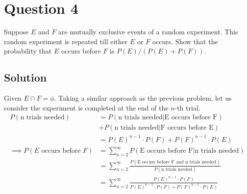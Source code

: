 \section*{Question 4}

Suppose \(E\) and \(F\) are mutually exclusive events of a random experiment.
This random experiment is repeated till either \(E\) or \(F\) occurs.
Show that the probability that \(E\) occurs before \(F\) is \( P(E) / (P(E) + P(F)) \).

\subsection*{Solution}

Given \( E \cap F = \phi \).
Taking a similar approach as the previous problem, let us consider the experiment is completed at the end of the \( n \)-th trial.
\begin{align*}
    P(\text{n trials needed})
     & =
    P(\text{n trials needed} | \text{E occurs before F})
    \\ & +
    P(\text{n trials needed} | \text{F occurs before E})
    \\ & =
    {P(E)}^{n-1} \cdot P(F)
    +
    {P(F)}^{n-1} \cdot P(E)
    \\
    \implies
    P(E \text{ occurs before } F)
     & =
    \sum_{n=2}^{\infty} P(\text{E occurs before F} | \text{n trials needed})
    \\ & =
    \sum_{n=2}^{\infty} \frac{P(\text{E occurs before F and n trials needed})}{P(\text{n trials needed})}
    \\ & =
    \sum_{n=2}^{\infty} \frac{{P(E)}^{n-1} \cdot P(F)}{{P(E)}^{n-1} \cdot P(F) + {P(F)}^{n-1} \cdot P(E)}
\end{align*}

